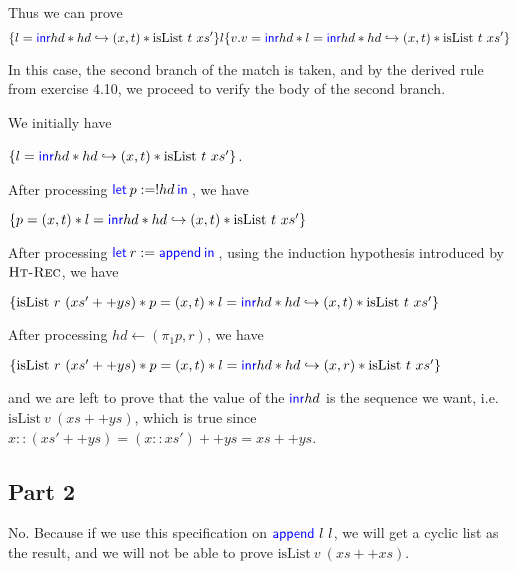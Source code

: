 \documentclass{article}
\begin{document}
Thus we can prove
$$
    \{l = \textsf{\color{blue} inr} hd \ast hd \hookrightarrow (x, t) \ast \text{isList} \ t \ xs' \} l \{v. v= \textsf{\color{blue} inr} hd \ast l = \textsf{\color{blue} inr} hd \ast hd \hookrightarrow (x, t) \ast \text{isList} \ t \ xs' \}
$$

In this case, the second branch of the match is taken, and by the derived rule from
exercise 4.10, we proceed to verify the body of the second branch.

We initially have

$\{l = \textsf{\color{blue} inr} hd \ast hd \hookrightarrow (x, t) \ast \text{isList} \ t \ xs' \}$.

After processing $\Let{p}={!hd}in$, we have

$\{p=(x,t) \ast l = \textsf{\color{blue} inr} hd \ast hd \hookrightarrow (x, t) \ast \text{isList} \ t \ xs' \}$

After processing $\Let{r}={\langkw{append}}in$, using the induction hypothesis introduced
by $\textsc{Ht-Rec}$, we have

$\{\text{isList} \ r \ (xs' ++ ys) \star p=(x,t) \star l = \Inr hd \star hd \gmapsto (x, t) \star \text{isList} \ t \ xs' \}$

After processing $hd \leftarrow (\pi_1 p, r)$, we have

$\{\text{isList} \ r \ (xs' ++ ys) \star p=(x,t) \star l = \Inr hd \star hd \gmapsto (x, r) \star \text{isList} \ t \ xs' \}$

and we are left to prove that the value of the $\textsf{\color{blue} inr} hd$ is the sequence we want, i.e.
$\text{isList} \ v \ (xs ++ ys)$, which is true since $x::(xs'++ys) = (x::xs')++ys = xs++ys$.


\subsection*{Part 2}

No. Because if we use this specification on $\textsf{\color{blue} append} \ l \ l$, we will get a
cyclic list as the result, and we will not be able to prove
$\text{isList} \ v \ (xs ++ xs)$.
\end{document}

